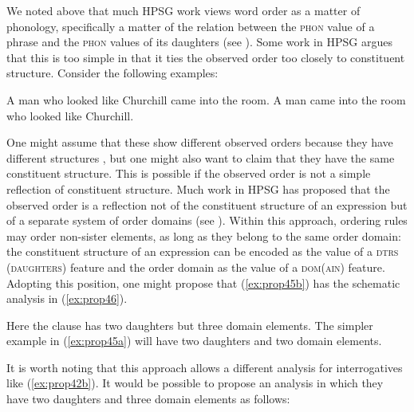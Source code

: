 \documentclass[output=paper
	        ,collection
	        ,collectionchapter
 	        ,biblatex
                ,babelshorthands
                ,newtxmath
                ,draftmode
                ,colorlinks, citecolor=brown
]{langscibook}
\begin{document}
We noted above that much HPSG work views word order as a matter of phonology, specifically a matter of the relation between the \textsc{phon} value of a phrase and the \textsc{phon} values of its daughters (see ). Some work in HPSG argues that this is too simple in that it ties the observed order too closely to constituent structure. Consider the following examples:

\eal\label{ex:prop45}
\ex\label{ex:prop45a}
A man who looked like Churchill came into the room.
\ex\label{ex:prop45b}
A man came into the room who looked like Churchill.
\zl

One might assume that these show different observed orders because they have different structures \citep{Kiss2005a}, but one might also want to claim that they have the same constituent structure.
 This is possible if the observed order is not a simple reflection of constituent structure. Much work in HPSG has proposed that the observed order is a reflection not of the constituent structure of an expression but of a separate system of order domains (see \citealp{Reape94a,Babel,Kathol2000a}). Within this approach, ordering rules may order non-sister elements, as long as they belong to the same order domain: the constituent structure of an expression can be encoded as the value of a \textsc{dtrs (daughters)} feature and the order domain as the value of a \textsc{dom(ain)} feature. Adopting this position, one might propose that (\ref{ex:prop45b}) has the schematic analysis in (\ref{ex:prop46}).

\ea\label{ex:prop46}
\z

Here the clause has two daughters but three domain elements. The simpler example in (\ref{ex:prop45a}) will have two daughters and two domain elements.

It is worth noting that this approach allows a different analysis for interrogatives like (\ref{ex:prop42b}). It would be possible to propose an analysis in which they have two daughters and three domain elements as follows:

\ea\label{ex:prop47}
\z
\end{document}
